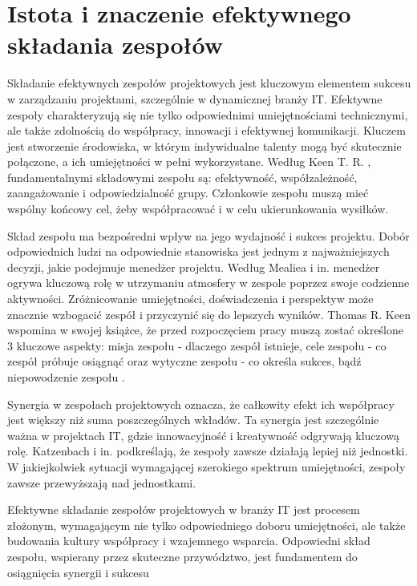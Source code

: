 \section{Istota i znaczenie efektywnego składania zespołów}
\par Składanie efektywnych zespołów projektowych jest kluczowym elementem sukcesu w zarządzaniu projektami, szczególnie w dynamicznej branży IT. Efektywne zespoły charakteryzują się nie tylko odpowiednimi umiejętnościami technicznymi, ale także zdolnością do współpracy, innowacji i efektywnej komunikacji. Kluczem jest stworzenie środowiska, w którym indywidualne talenty mogą być skutecznie połączone, a ich umiejętności w pełni wykorzystane. Według Keen T. R. \parencite{keen2003creating}, fundamentalnymi składowymi zespołu są: efektywność, współzależność, zaangażowanie i odpowiedzialność grupy. Członkowie zespołu muszą mieć wspólny końcowy cel, żeby współpracować i w celu ukierunkowania wysiłków.
\par Skład zespołu ma bezpośredni wpływ na jego wydajność i sukces projektu. Dobór odpowiednich ludzi na odpowiednie stanowiska jest jednym z najważniejszych decyzji, jakie podejmuje menedżer projektu. Według Mealiea i in. \parencite{mealiea2005strategic} menedżer ogrywa kluczową rolę w utrzymaniu atmosfery w zespole poprzez swoje codzienne aktywności. Zróżnicowanie umiejętności, doświadczenia i perspektyw może znacznie wzbogacić zespół i przyczynić się do lepszych wyników. Thomas R. Keen wspomina w swojej książce, że przed rozpoczęciem pracy muszą zostać określone 3 kluczowe aspekty: misja zespołu - dlaczego zespół istnieje, cele zespołu - co zespół próbuje osiągnąć oraz wytyczne zespołu - co określa sukces, bądź niepowodzenie zespołu \parencite{keen2003creating}.
\par Synergia w zespołach projektowych oznacza, że całkowity efekt ich współpracy jest większy niż suma poszczególnych wkładów. Ta synergia jest szczególnie ważna w projektach IT, gdzie innowacyjność i kreatywność odgrywają kluczową rolę. Katzenbach i in. \parencite{katzenbach2015wisdom} podkreślają, że zespoły zawsze działają lepiej niż jednostki. W jakiejkolwiek sytuacji wymagającej szerokiego spektrum umiejętności, zespoły zawsze przewyższają nad jednostkami.
\par Efektywne składanie zespołów projektowych w branży IT jest procesem złożonym, wymagającym nie tylko odpowiedniego doboru umiejętności, ale także budowania kultury współpracy i wzajemnego wsparcia. Odpowiedni skład zespołu, wspierany przez skuteczne przywództwo, jest fundamentem do osiągnięcia synergii i sukcesu

